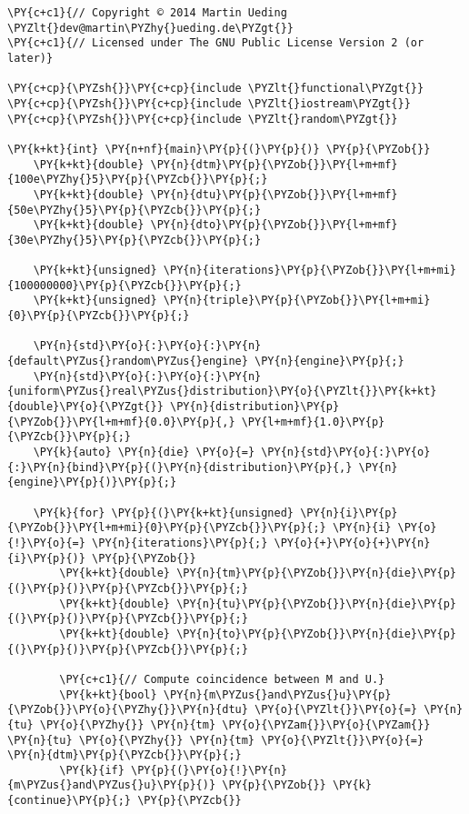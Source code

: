 \begin{Verbatim}[commandchars=\\\{\}]
\PY{c+c1}{// Copyright © 2014 Martin Ueding \PYZlt{}dev@martin\PYZhy{}ueding.de\PYZgt{}}
\PY{c+c1}{// Licensed under The GNU Public License Version 2 (or later)}

\PY{c+cp}{\PYZsh{}}\PY{c+cp}{include \PYZlt{}functional\PYZgt{}}
\PY{c+cp}{\PYZsh{}}\PY{c+cp}{include \PYZlt{}iostream\PYZgt{}}
\PY{c+cp}{\PYZsh{}}\PY{c+cp}{include \PYZlt{}random\PYZgt{}}

\PY{k+kt}{int} \PY{n+nf}{main}\PY{p}{(}\PY{p}{)} \PY{p}{\PYZob{}}
    \PY{k+kt}{double} \PY{n}{dtm}\PY{p}{\PYZob{}}\PY{l+m+mf}{100e\PYZhy{}5}\PY{p}{\PYZcb{}}\PY{p}{;}
    \PY{k+kt}{double} \PY{n}{dtu}\PY{p}{\PYZob{}}\PY{l+m+mf}{50e\PYZhy{}5}\PY{p}{\PYZcb{}}\PY{p}{;}
    \PY{k+kt}{double} \PY{n}{dto}\PY{p}{\PYZob{}}\PY{l+m+mf}{30e\PYZhy{}5}\PY{p}{\PYZcb{}}\PY{p}{;}

    \PY{k+kt}{unsigned} \PY{n}{iterations}\PY{p}{\PYZob{}}\PY{l+m+mi}{100000000}\PY{p}{\PYZcb{}}\PY{p}{;}
    \PY{k+kt}{unsigned} \PY{n}{triple}\PY{p}{\PYZob{}}\PY{l+m+mi}{0}\PY{p}{\PYZcb{}}\PY{p}{;}

    \PY{n}{std}\PY{o}{:}\PY{o}{:}\PY{n}{default\PYZus{}random\PYZus{}engine} \PY{n}{engine}\PY{p}{;}
    \PY{n}{std}\PY{o}{:}\PY{o}{:}\PY{n}{uniform\PYZus{}real\PYZus{}distribution}\PY{o}{\PYZlt{}}\PY{k+kt}{double}\PY{o}{\PYZgt{}} \PY{n}{distribution}\PY{p}{\PYZob{}}\PY{l+m+mf}{0.0}\PY{p}{,} \PY{l+m+mf}{1.0}\PY{p}{\PYZcb{}}\PY{p}{;}
    \PY{k}{auto} \PY{n}{die} \PY{o}{=} \PY{n}{std}\PY{o}{:}\PY{o}{:}\PY{n}{bind}\PY{p}{(}\PY{n}{distribution}\PY{p}{,} \PY{n}{engine}\PY{p}{)}\PY{p}{;}

    \PY{k}{for} \PY{p}{(}\PY{k+kt}{unsigned} \PY{n}{i}\PY{p}{\PYZob{}}\PY{l+m+mi}{0}\PY{p}{\PYZcb{}}\PY{p}{;} \PY{n}{i} \PY{o}{!}\PY{o}{=} \PY{n}{iterations}\PY{p}{;} \PY{o}{+}\PY{o}{+}\PY{n}{i}\PY{p}{)} \PY{p}{\PYZob{}}
        \PY{k+kt}{double} \PY{n}{tm}\PY{p}{\PYZob{}}\PY{n}{die}\PY{p}{(}\PY{p}{)}\PY{p}{\PYZcb{}}\PY{p}{;}
        \PY{k+kt}{double} \PY{n}{tu}\PY{p}{\PYZob{}}\PY{n}{die}\PY{p}{(}\PY{p}{)}\PY{p}{\PYZcb{}}\PY{p}{;}
        \PY{k+kt}{double} \PY{n}{to}\PY{p}{\PYZob{}}\PY{n}{die}\PY{p}{(}\PY{p}{)}\PY{p}{\PYZcb{}}\PY{p}{;}

        \PY{c+c1}{// Compute coincidence between M and U.}
        \PY{k+kt}{bool} \PY{n}{m\PYZus{}and\PYZus{}u}\PY{p}{\PYZob{}}\PY{o}{\PYZhy{}}\PY{n}{dtu} \PY{o}{\PYZlt{}}\PY{o}{=} \PY{n}{tu} \PY{o}{\PYZhy{}} \PY{n}{tm} \PY{o}{\PYZam{}}\PY{o}{\PYZam{}} \PY{n}{tu} \PY{o}{\PYZhy{}} \PY{n}{tm} \PY{o}{\PYZlt{}}\PY{o}{=} \PY{n}{dtm}\PY{p}{\PYZcb{}}\PY{p}{;}
        \PY{k}{if} \PY{p}{(}\PY{o}{!}\PY{n}{m\PYZus{}and\PYZus{}u}\PY{p}{)} \PY{p}{\PYZob{}} \PY{k}{continue}\PY{p}{;} \PY{p}{\PYZcb{}}


\end{Verbatim}
